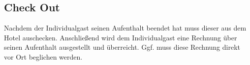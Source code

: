 \documentclass[../SubfileFeatures.tex]{subfiles}
\begin{document}
    \subsection{Check Out}
    Nachdem der Individualgast seinen Aufenthalt beendet hat muss dieser aus dem Hotel auschecken.
    Anschließend wird dem Individualgast eine Rechnung über seinen Aufenthalt ausgestellt und überreicht.
    Ggf. muss diese Rechnung direkt vor Ort beglichen werden.
\end{document}
